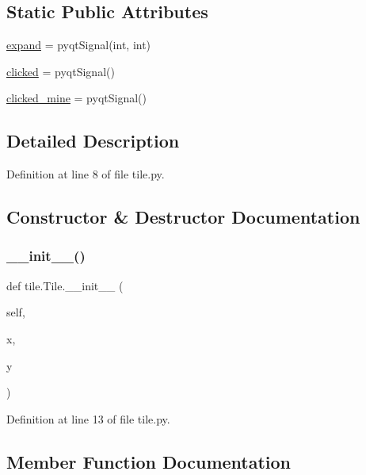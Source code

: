\subsection*{Static Public Attributes}
\begin{DoxyCompactItemize}
\item 
\mbox{\hyperlink{classtile_1_1_tile_ae9b20af77c912b727aabee12e0619af7}{expand}} = pyqt\+Signal(int, int)
\item 
\mbox{\hyperlink{classtile_1_1_tile_ae9f624960119eb87e6d64a1563ac6079}{clicked}} = pyqt\+Signal()
\item 
\mbox{\hyperlink{classtile_1_1_tile_a944560e1cb2bb5ccd3849527fc5dd736}{clicked\+\_\+mine}} = pyqt\+Signal()
\end{DoxyCompactItemize}


\subsection{Detailed Description}


Definition at line 8 of file tile.\+py.



\subsection{Constructor \& Destructor Documentation}
\mbox{\label{classtile_1_1_tile_a4f02fc7ff22b66bbf6d4660eab79ad8a}} 
\subsubsection{\texorpdfstring{\_\_init\_\_()}{\_\_init\_\_()}}
{\footnotesize\ttfamily def tile.\+Tile.\+\_\+\+\_\+init\+\_\+\+\_\+ (\begin{DoxyParamCaption}\item[{}]{self,  }\item[{}]{x,  }\item[{}]{y }\end{DoxyParamCaption})}



Definition at line 13 of file tile.\+py.



\subsection{Member Function Documentation}
\mbox{\label{classtile_1_1_tile_a024a479a7f7a0b8b4cc9c77f913bb6e3}} 
